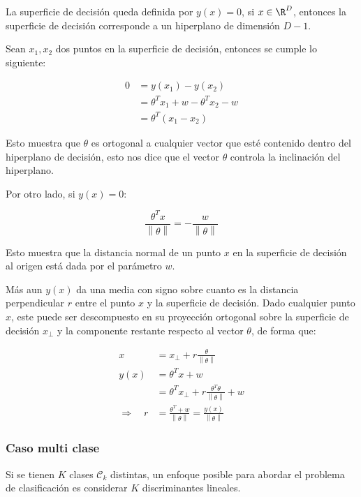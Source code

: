 \vspace{1cm}
La superficie de decisión queda definida por $y(x)=0$, si $x\in\R^D$, entonces la superficie de decisión corresponde a un hiperplano de dimensión $D-1$.

Sean $x_1,x_2$ dos puntos en la superficie de decisión, entonces se cumple lo siguiente:

\begin{align}
	0 &= y(x_1) - y(x_2) \nonumber\\
	  &= \theta^Tx_1 + w - \theta^Tx_2 - w \nonumber\\
	  &= \theta^T(x_1-x_2)
\end{align}

Esto muestra que $\theta$ es ortogonal a cualquier vector que esté contenido dentro del hiperplano de decisión, esto nos dice que el vector $\theta$ controla la inclinación del hiperplano.

Por otro lado, si $y(x)=0$:

\begin{equation}
	\frac{\theta^Tx}{\left \| \theta \right \|} = -\frac{w}{\left \| \theta \right \|}
\end{equation}

Esto muestra que la distancia normal de un punto $x$ en la superficie de decisión al origen está dada por el parámetro $w$.

Más aun $y(x)$ da una media con signo sobre cuanto es la distancia perpendicular $r$ entre el punto $x$ y la superficie de decisión. Dado cualquier punto $x$, este puede ser descompuesto en su proyección ortogonal sobre la superficie de decisión $x_{\bot}$ y la componente restante respecto al vector $\theta$, de forma que:

\begin{align}
	x &= x_{\bot}+r\frac{\theta}{\left \| \theta \right \|}\\
	y(x) &= \theta^Tx+w\\
	&= \theta^Tx_{\bot} + r\frac{\theta^T\theta}{\left \| \theta \right \|} + w\\
	\Rightarrow \quad r &= \frac{\theta^T+w}{\left \| \theta \right \|} 
	= \frac{y(x)}{\left \| \theta \right \|}
\end{align}

\newpage
\subsubsection{Caso multi clase}

Si se tienen $K$ clases $\mathcal{C}_k$ distintas, un enfoque posible para abordar el problema de clasificación es considerar $K$ discriminantes lineales.

